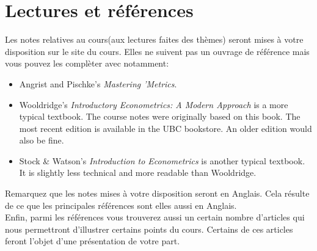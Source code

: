 \section*{Lectures et références}

Les notes relatives au cours(aux lectures faites des thèmes) seront mises à votre disposition sur le site du cours.
Elles ne suivent pas un ouvrage de référence mais vous pouvez les complèter avec  notamment:
\begin{itemize}
\item Angrist and Pischke's {\slshape
  Mastering 'Metrics}.  
\item Wooldridge's {\slshape Introductory Econometrics: A Modern Approach}
is a more typical textbook. The course notes were originally based on
this book. The most recent edition is available in the UBC
bookstore. An older edition would also be fine. 
\item Stock \& Watson's {\slshape Introduction to Econometrics} is another
typical textbook. It is slightly less technical and more readable than
Wooldridge. 
\end{itemize}
Remarquez que les notes mises à votre disposition seront en Anglais. Cela résulte de ce que les principales références sont elles aussi en Anglais.\\
Enfin, parmi les références vous trouverez aussi un certain nombre d'articles qui nous permettront d'illustrer certains points du cours. Certains de ces articles feront l'objet d'une présentation de votre part.







